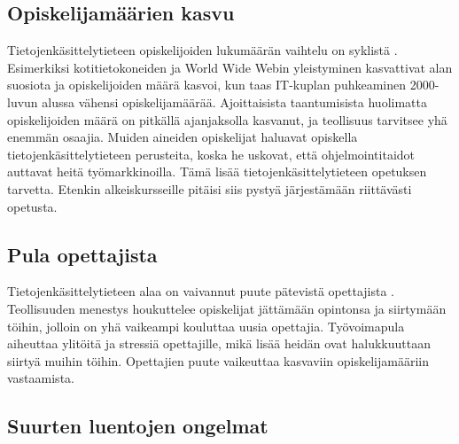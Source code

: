 \documentclass[finnish]{tktltiki2}
\theoremstyle{definition}
\theoremstyle{remark}
\begin{document}
\subsection{Opiskelijamäärien kasvu}
Tietojenkäsittelytieteen opiskelijoiden lukumäärän vaihtelu on syklistä \cite{Roberts11}. Esimerkiksi kotitietokoneiden ja World Wide Webin yleistyminen kasvattivat alan suosiota ja opiskelijoiden määrä kasvoi, kun taas IT-kuplan puhkeaminen 2000-luvun alussa vähensi opiskelijamäärää. Ajoittaisista taantumisista huolimatta opiskelijoiden määrä on pitkällä ajanjaksolla kasvanut, ja teollisuus tarvitsee yhä enemmän osaajia. Muiden aineiden opiskelijat haluavat opiskella tietojenkäsittelytieteen perusteita, koska he uskovat, että ohjelmointitaidot auttavat heitä työmarkkinoilla. Tämä lisää tietojenkäsittelytieteen opetuksen tarvetta. Etenkin alkeiskursseille pitäisi siis pystyä järjestämään riittävästi opetusta. 

\subsection{Pula opettajista}
Tietojenkäsittelytieteen alaa on vaivannut puute pätevistä opettajista \cite{Roberts99}. Teollisuuden menestys houkuttelee opiskelijat jättämään opintonsa ja siirtymään töihin, jolloin on yhä vaikeampi kouluttaa uusia opettajia. Työ\-voi\-ma\-pu\-la aiheuttaa ylitöitä ja stressiä opettajille, mikä lisää heidän ovat halukkuuttaan siirtyä muihin töihin. Opettajien puute vaikeuttaa kasvaviin opiskelijamääriin vastaamista.

\subsection{Suurten luentojen ongelmat}
\end{document}
